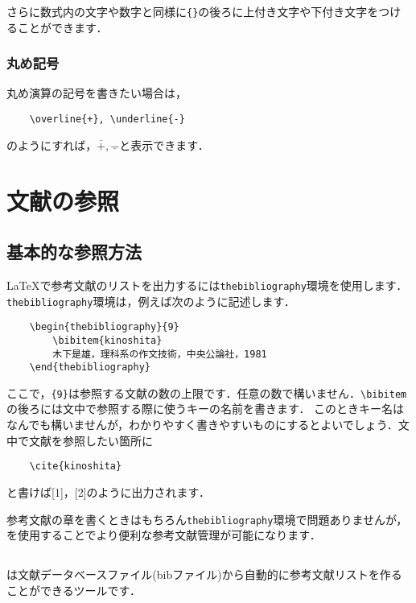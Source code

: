 \documentclass[a4paper,11pt]{ltjsreport}
\numberwithin{equation}{section}
\theoremstyle{definition}
\begin{document}
さらに数式内の文字や数字と同様に\verb|{}|の後ろに上付き文字や下付き文字をつけることができます．

\subsection{丸め記号}

丸め演算の記号を書きたい場合は，
\begin{verbatim}
    \overline{+}, \underline{-}
\end{verbatim}
のようにすれば，$\overline{+},\underline{-}$と表示できます．



\chapter{文献の参照}


\section{基本的な参照方法}

\LaTeX で参考文献のリストを出力するには\verb|thebibliography|環境を使用します\cite{bibunsyo}．
\verb|thebibliography|環境は，例えば次のように記述します．
\begin{verbatim}
    \begin{thebibliography}{9}
        \bibitem{kinoshita}
        木下是雄，理科系の作文技術，中央公論社，1981
    \end{thebibliography}
\end{verbatim}

ここで，\verb|{9}|は参照する文献の数の上限です．任意の数で構いません．\verb|\bibitem|の後ろには文中で参照する際に使うキーの名前を書きます．
このときキー名はなんでも構いませんが，わかりやすく書きやすいものにするとよいでしょう．文中で文献を参照したい箇所に
\begin{verbatim}
    \cite{kinoshita}
\end{verbatim}
と書けば[1]，[2]のように出力されます．

参考文献の章を書くときはもちろん\verb|thebibliography|環境で問題ありませんが，
\BibTeX を使用することでより便利な参考文献管理が可能になります．


\section{\BibTeX}

 {\BibTeX}は文献データベースファイル(bibファイル)から自動的に参考文献リストを作ることができるツールです\cite{bibunsyo}．
\end{document}
